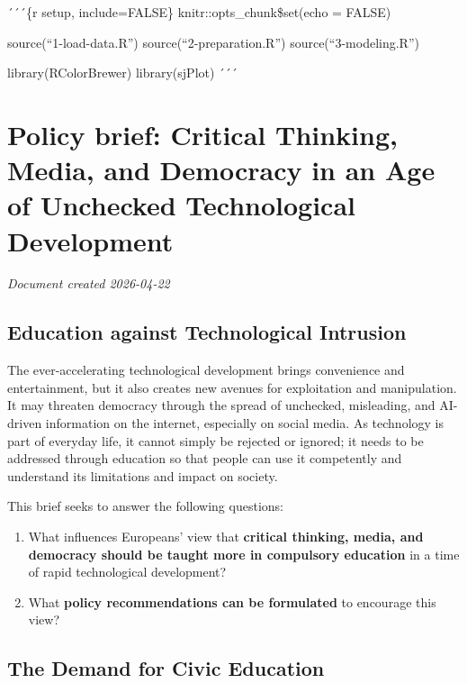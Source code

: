 \documentclass[
]{article}
\author{}
\date{\vspace{-2.5em}}
\begin{document}
´´´\{r setup, include=FALSE\} knitr::opts\_chunk\$set(echo = FALSE)

source(``1-load-data.R'') source(``2-preparation.R'')
source(``3-modeling.R'')

library(RColorBrewer) library(sjPlot) ´´´

\section{Policy brief: Critical Thinking, Media, and Democracy in an Age
of Unchecked Technological
Development}\label{policy-brief-critical-thinking-media-and-democracy-in-an-age-of-unchecked-technological-development}

\textit{Document created 2026-04-22}

\subsection{Education against Technological
Intrusion}\label{education-against-technological-intrusion}

The ever-accelerating technological development brings convenience and
entertainment, but it also creates new avenues for exploitation and
manipulation. It may threaten democracy through the spread of unchecked,
misleading, and AI-driven information on the internet, especially on
social media. As technology is part of everyday life, it cannot simply
be rejected or ignored; it needs to be addressed through education so
that people can use it competently and understand its limitations and
impact on society.

\begin{center}
\begin{tcolorbox}[orangebox]
This brief seeks to answer the following questions:

\begin{enumerate}
  \item What influences Europeans' view that \textbf{critical thinking, media, and democracy should be taught more in compulsory education} in a time of rapid technological development?
  \item What \textbf{policy recommendations can be formulated} to encourage this view?
\end{enumerate}
\end{tcolorbox}
\end{center}

\subsection{The Demand for Civic
Education}\label{the-demand-for-civic-education}
\end{document}
